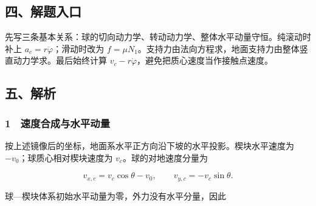 \documentclass[12pt,a4paper,fontset=fandol]{ctexart}
\begin{document}
\begin{center}
\begin{minipage}{\linewidth}
\centering\begingroup{}
\ifdim\wd\diagrambox>.88\linewidth
\sbox{\diagrambox}{\resizebox{.88\linewidth}{!}{\usebox{\diagrambox}}}\fi
\ifdim\ht\diagrambox>.38\textheight
\resizebox{!}{.38\textheight}{\usebox{\diagrambox}}
\else\usebox{\diagrambox}\fi
\par{}\endgroup\end{minipage}\end{center}

\subsection{四、解题入口}\label{ux56dbux89e3ux9898ux5165ux53e3-2}

先写三条基本关系：球的切向动力学、转动动力学、整体水平动量守恒。纯滚动时补上
\(a_c=r\ddot\varphi\)；滑动时改为
\(f=\mu N_1\)。支持力由法向方程求，地面支持力由整体竖直动力学求。最后始终计算
\(v_c-r\dot\varphi\)，避免把质心速度当作接触点速度。

\subsection{五、解析}\label{ux4e94ux89e3ux6790-2}

\subsubsection{1　速度合成与水平动量}\label{ux901fux5ea6ux5408ux6210ux4e0eux6c34ux5e73ux52a8ux91cf}

按上述镜像后的坐标，地面系水平正方向沿下坡的水平投影。楔块水平速度为
\(-v_0\)；球质心相对楔块速度为 \(v_c\)。球的对地速度分量为

\[v_{x,c}=v_c\cos\theta-v_0,\qquad
v_{y,c}=-v_c\sin\theta.\]

球---楔块体系初始水平动量为零，外力没有水平分量，因此
\end{document}

